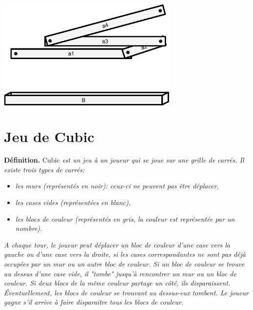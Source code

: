 \documentclass[12pt]{article}
\begin{document}
\centerline{\includegraphics[width=9cm]{figures/regle.pdf}}


\newpage
\section{Jeu de Cubic}
\noindent \textbf{Définition.} Cubic \textit{est un jeu à un joueur qui se joue sur une grille de carrés. Il existe trois types de carrés:}
\begin{itemize}
\item \textit{les murs (représentés en noir): ceux-ci ne peuvent pas être déplacer,}
\item \textit{les cases vides (représentées en blanc),}
\item \textit{les blocs de couleur (représentés en gris, la couleur est représentée par un nombre).}
\end{itemize}
\textit{A chaque tour, le joueur peut déplacer un bloc de couleur d'une case vers la gauche ou d'une case vers la droite, si les cases correspondantes ne sont pas déjà occupées par un mur ou un autre bloc de couleur. Si un bloc de couleur se trouve au dessus d'une case vide, il "tombe" jusqu'à rencontrer un mur ou un bloc de couleur. Si deux blocs de la même couleur partage un côté, ils disparaissent. Éventuellement, les blocs de couleur se trouvant au dessus-eux tombent. Le joueur gagne s'il arrive à faire disparaitre tous les blocs de couleur.}
\end{document}
